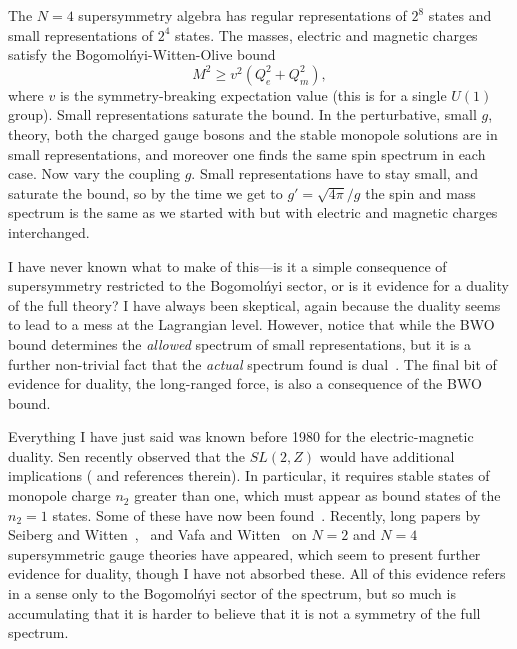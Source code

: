 The $N=4$ supersymmetry algebra has regular representations of $2^8$
states and small representations of $2^4$ states.  The masses,
electric and magnetic charges satisfy the Bogomol\'nyi-Witten-Olive
bound~\cite{WO}
\begin{equation}
M^2 \geq v^2 (Q_e^2 + Q_m^2), \label{bwo}
\end{equation}
where $v$ is the symmetry-breaking expectation value (this is for a
single $U(1)$ group).  Small representations saturate the bound.
In the perturbative,
small $g$, theory, both the charged gauge bosons and the
stable monopole solutions are in small representations, and moreover
one finds the same spin spectrum in each case.  Now vary the
coupling $g$.  Small representations have to stay small, and saturate
the bound, so by the time we get to $g' = \sqrt{4\pi}/g$ the spin and
mass spectrum is the same as we started with but with electric and
magnetic charges interchanged.

I have never known what to make of this---is it a simple consequence
of supersymmetry restricted to the Bogomol\'nyi sector, or is it
evidence for a duality of the full theory?  I have always been
skeptical, again because the duality seems to lead to a mess at
the Lagrangian level.
However, notice that while the BWO bound determines the {\it allowed}
spectrum of small representations, but it is a further non-trivial
fact that the {\it actual} spectrum found is dual~\cite{Osb}.  The
final bit of evidence for duality, the long-ranged force, is also a
consequence of the BWO bound.

Everything I have just said was known before 1980 for the
electric-magnetic duality.  Sen recently observed that the $SL(2,Z)$
would have additional implications (\cite{Senrev} and references
therein).  In particular, it requires stable states of monopole
charge
$n_2$ greater than one, which must appear as bound states of the
$n_2 = 1$ states.  Some of these have now been
found~\cite{Senbound}.  Recently, long papers by Seiberg
and Witten~\cite{SW1},~\cite{SW2} and Vafa and Witten~\cite{VafW} on
$N=2$ and
$N=4$ supersymmetric gauge theories have appeared, which seem to
present further evidence for duality, though I have not absorbed
these. All of this evidence refers in a sense only to the
Bogomol\'nyi sector of the spectrum, but so much is accumulating
that it is harder to believe that it is not a symmetry of the full
spectrum.

